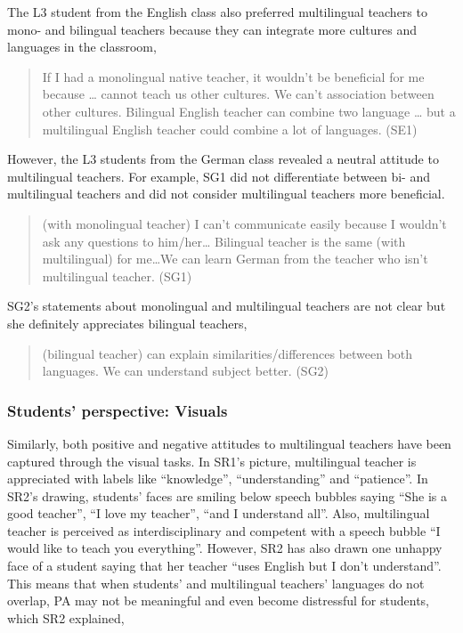 \documentclass[output=paper]{../langscibook}
\begin{document}
\noindent The L3 student from the English class also preferred multilingual teachers to mono- and bilingual teachers because they can integrate more cultures and languages in the classroom,

\begin{quote}
If I had a monolingual native teacher, it wouldn’t be beneficial for me because … cannot teach us other cultures. We can’t association between other cultures. Bilingual English teacher can combine two language … but a multilingual English teacher could combine a lot of languages. (SE1)
\end{quote}

\noindent However, the L3 students from the German class revealed a neutral attitude to multilingual teachers. For example, SG1 did not differentiate between bi- and multilingual teachers and did not consider multilingual teachers more beneficial. 

\begin{quote}
 (with monolingual teacher) I can't communicate easily because I wouldn't ask any questions to him/her… Bilingual teacher is the same (with multilingual) for me…We can learn German from the teacher who isn’t multilingual teacher. (SG1)
\end{quote}

\noindent SG2’s statements about monolingual and multilingual teachers are not clear but she definitely appreciates bilingual teachers,

\begin{quote}
 (bilingual teacher) can explain similarities/differences between both languages. We can understand subject better. (SG2)
\end{quote}


\subsubsection{Students’ perspective: Visuals}


Similarly, both positive and negative attitudes to multilingual teachers have been captured through the visual tasks. In SR1’s picture, multilingual teacher is appreciated with labels like “knowledge”, “understanding” and “patience”. In SR2’s drawing, students’ faces are smiling below speech bubbles saying “She is a good teacher”, “I love my teacher”, “and I understand all”. Also, multilingual teacher is perceived as interdisciplinary and competent with a speech bubble “I would like to teach you everything”. However, SR2 has also drawn one unhappy face of a student saying that her teacher “uses English but I don’t understand”. This means that when students’ and multilingual teachers’ languages do not overlap, PA may not be meaningful and even become distressful for students, which SR2 explained, 
\end{document}
